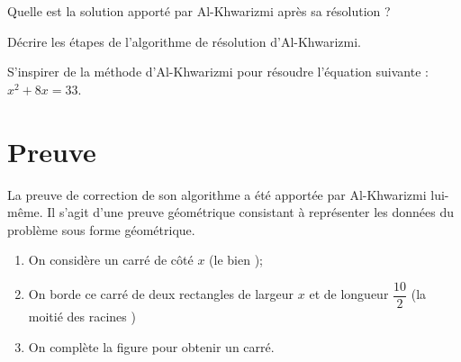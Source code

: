 \documentclass{article}
\begin{document}
\begin{enumquestions}
\item Quelle est la solution apporté par Al-Khwarizmi après sa résolution ?
\item Décrire les étapes de l'algorithme de résolution d'Al-Khwarizmi.
\item S'inspirer de la méthode d'Al-Khwarizmi pour résoudre l'équation suivante : $x^2 + 8x = 33$.
\end{enumquestions}
\newpage

\emptybox{8cm}

\section{Preuve}

La preuve de correction de son algorithme a été apportée par Al-Khwarizmi lui-même. Il s'agit d'une preuve géométrique consistant à représenter les données du problème sous forme géométrique.

\begin{center}
\end{center}
\begin{enumerate}
\item On considère un carré de côté $x$ (le \og bien \fg);
\item On borde ce carré de deux rectangles de largeur $x$ et de longueur $\dfrac{10}{2}$ (la moitié des \og racines \fg)
\item On complète la figure pour obtenir un carré. 
\end{enumerate}
\end{document}
